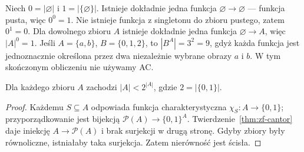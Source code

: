 \begin{przyklad}
\label{ex:card-zero-exponents}
Niech $0=|\varnothing|$ i $1=|\{\varnothing\}|$.
Istnieje dokładnie jedna funkcja
$\varnothing\to\varnothing$ --- funkcja pusta,
więc $0^0=1$. Nie istnieje funkcja z singletonu
do zbioru pustego, zatem $0^1=0$.
Dla dowolnego zbioru $A$ istnieje
dokładnie jedna funkcja $\varnothing\to A$,
więc $|A|^0=1$.
Jeśli $A=\{a,b\}$, $B=\{0,1,2\}$,
to $|B^A|=3^2=9$, gdyż każda funkcja
jest jednoznacznie określona przez dwa
niezależnie wybrane obrazy $a$ i $b$.
W tym skończonym obliczeniu nie używamy AC.
\end{przyklad}

\begin{twierdzenie}\label{thm:card-cantor}
Dla każdego zbioru $A$ zachodzi $|A|<2^{|A|}$, gdzie $2=|\{0,1\}|$.
\end{twierdzenie}
\begin{proof}
Każdemu $S\subseteq A$ odpowiada funkcja charakterystyczna $\chi_S:A\to\{0,1\}$; przyporządkowanie jest bijekcją $\mathcal P(A)\to\{0,1\}^A$. Twierdzenie~\ref{thm:zf-cantor} daje iniekcję $A\to\mathcal P(A)$ i brak surjekcji w drugą stronę. Gdyby zbiory były równoliczne, istniałaby taka surjekcja. Zatem nierówność jest ścisła.
\end{proof}

